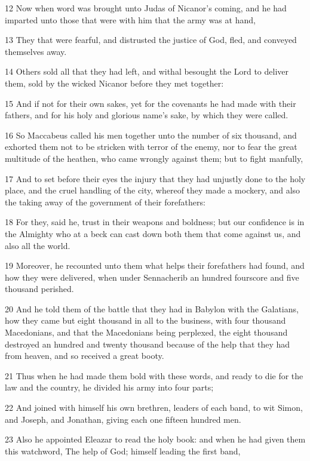 \par 12 Now when word was brought unto Judas of Nicanor's coming, and he had imparted unto those that were with him that the army was at hand,
\par 13 They that were fearful, and distrusted the justice of God, fled, and conveyed themselves away.
\par 14 Others sold all that they had left, and withal besought the Lord to deliver them, sold by the wicked Nicanor before they met together:
\par 15 And if not for their own sakes, yet for the covenants he had made with their fathers, and for his holy and glorious name's sake, by which they were called.
\par 16 So Maccabeus called his men together unto the number of six thousand, and exhorted them not to be stricken with terror of the enemy, nor to fear the great multitude of the heathen, who came wrongly against them; but to fight manfully,
\par 17 And to set before their eyes the injury that they had unjustly done to the holy place, and the cruel handling of the city, whereof they made a mockery, and also the taking away of the government of their forefathers:
\par 18 For they, said he, trust in their weapons and boldness; but our confidence is in the Almighty who at a beck can cast down both them that come against us, and also all the world.
\par 19 Moreover, he recounted unto them what helps their forefathers had found, and how they were delivered, when under Sennacherib an hundred fourscore and five thousand perished.
\par 20 And he told them of the battle that they had in Babylon with the Galatians, how they came but eight thousand in all to the business, with four thousand Macedonians, and that the Macedonians being perplexed, the eight thousand destroyed an hundred and twenty thousand because of the help that they had from heaven, and so received a great booty.
\par 21 Thus when he had made them bold with these words, and ready to die for the law and the country, he divided his army into four parts;
\par 22 And joined with himself his own brethren, leaders of each band, to wit Simon, and Joseph, and Jonathan, giving each one fifteen hundred men.
\par 23 Also he appointed Eleazar to read the holy book: and when he had given them this watchword, The help of God; himself leading the first band,
